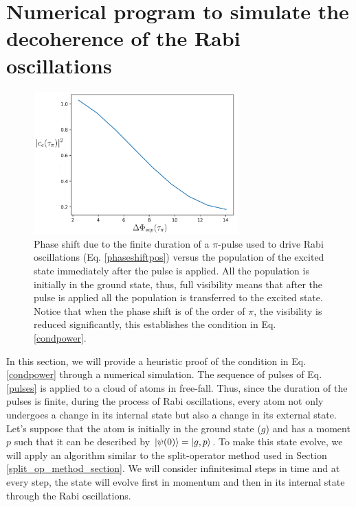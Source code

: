 \documentclass{article}
\begin{document}
\appendix

\section{\label{apendice1}Numerical program to simulate the decoherence of the Rabi oscillations}

\begin{figure}
\centering
\includegraphics[width=0.7\textwidth]{decoherence rabi oscillations.png}
\caption{Phase shift due to the finite duration of a $\pi$-pulse used to drive Rabi oscillations (Eq. \ref{phaseshiftpos}) versus the population of the excited state immediately after the pulse is applied. All the population is initially in the ground state, thus, full visibility means that after the pulse is applied all the population is transferred to the excited state. Notice that when the phase shift is of the order of $\pi$, the visibility is reduced significantly, this establishes the condition in Eq. \ref{condpower}.}
\label{decoherence_rabi_oscillations_plot}
\end{figure}

In this section, we will provide a heuristic proof of the condition in Eq. \ref{condpower} through a numerical simulation. The sequence of pulses of Eq. \ref{pulses} is applied to a cloud of atoms in free-fall. Thus, since the duration of the pulses is finite, during the process of Rabi oscillations, every atom not only undergoes a change in its internal state but also a change in its external state. Let's suppose that the atom is initially in the ground state ($g$) and has a moment $p$ such that it can be described by $\ket{\psi(0)} = \ket{g, p}$. To make this state evolve, we will apply an algorithm similar to the split-operator method used in Section \ref{split_op_method_section}. We will consider infinitesimal steps in time and at every step, the state will evolve first in momentum and then in its internal state through the Rabi oscillations.
\end{document}
